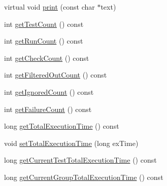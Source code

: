 \begin{DoxyCompactItemize}
virtual void \hyperlink{class_test_result_aeee8b15298e1baa2d0ced78c1fcb4b90}{print} (const char $\ast$text)
\item 
int \hyperlink{class_test_result_a1c38e7dbb03d19b1a5845926f64bde9f}{get\+Test\+Count} () const 
\item 
int \hyperlink{class_test_result_a4e700cf300b5d035a06f9e74eaf50d78}{get\+Run\+Count} () const 
\item 
int \hyperlink{class_test_result_a4627b4853142292095fb390fef6f7ac4}{get\+Check\+Count} () const 
\item 
int \hyperlink{class_test_result_a81edc31ea12701eea6c2c083a54d71ae}{get\+Filtered\+Out\+Count} () const 
\item 
int \hyperlink{class_test_result_a66d58d823113bebd2b40bef293ccc5e9}{get\+Ignored\+Count} () const 
\item 
int \hyperlink{class_test_result_abb8c64011fa53bb1950110a564b56027}{get\+Failure\+Count} () const 
\item 
long \hyperlink{class_test_result_abdeef3479981cd95bb8327312249ffe6}{get\+Total\+Execution\+Time} () const 
\item 
void \hyperlink{class_test_result_a029210c21429a61982185a85b5c022b4}{set\+Total\+Execution\+Time} (long ex\+Time)
\item 
long \hyperlink{class_test_result_a3c06bb4516065fd2ba57231e246002e9}{get\+Current\+Test\+Total\+Execution\+Time} () const 
\item 
long \hyperlink{class_test_result_a15ba962bc1cfa2e7c6ca02ba4c37e76c}{get\+Current\+Group\+Total\+Execution\+Time} () const 
\end{DoxyCompactItemize}
